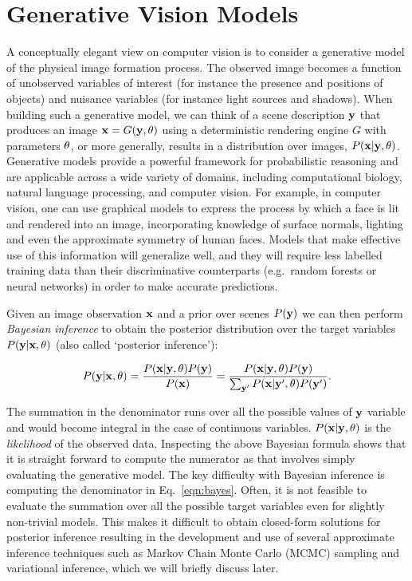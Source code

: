 \section{Generative Vision Models}
\label{sec:gen-models}

A conceptually elegant view on computer vision is to consider a generative
model of the physical image formation process. The observed image becomes a
function of unobserved variables of interest (for instance the presence and positions
of objects) and nuisance variables (for instance light sources and shadows).
%
When building such a generative model, we can think of a scene description
$\mathbf{y}$ that produces an image $\mathbf{x}=G(\mathbf{y},\theta)$ using a deterministic
rendering engine $G$ with parameters $\mathbf{\theta}$, or more generally,
results in a distribution over images, $P(\mathbf{x}|\mathbf{y},\mathbf{\theta})$.
%
Generative models provide a powerful framework for probabilistic reasoning and
are applicable across a wide variety of domains, including computational biology,
natural language processing, and computer vision. For example, in computer vision,
one can use graphical models to express the process by which a face is lit and
rendered into an image, incorporating knowledge of surface normals, lighting and
even the approximate symmetry of human faces. Models that make effective use of this
information will generalize well, and they will require less labelled training data
than their discriminative counterparts (e.g.\ random forests or neural networks) in order
to make accurate predictions.

Given an image observation $\mathbf{x}$ and a prior over scenes $P(\mathbf{y})$ we can
then perform \textit{Bayesian inference} to obtain the posterior distribution over the
target variables $P(\mathbf{y} | \mathbf{x},\mathbf{\theta})$
(also called `posterior inference'):

\begin{equation}
P(\mathbf{y} | \mathbf{x},\mathbf{\theta}) =
\frac{P(\mathbf{x}|\mathbf{y},\mathbf{\theta})P(\mathbf{y})}{P(\mathbf{x})} =
\frac{P(\mathbf{x}|\mathbf{y},\mathbf{\theta})P(\mathbf{y})}{\sum_{\mathbf{y}'} P(\mathbf{x}|\mathbf{y}',\mathbf{\theta})P(\mathbf{y}')}.
\label{eqn:bayes}
\end{equation}

The summation in the denominator runs over all the possible values of $\mathbf{y}$ variable and
would become integral in the case of continuous
variables. $P(\mathbf{x}|\mathbf{y},\mathbf{\theta})$ is the \emph{likelihood} of the observed data. Inspecting
the above Bayesian formula shows that it is straight forward to compute the numerator
as that involves simply evaluating the generative model. The key difficulty with
Bayesian inference is computing the denominator in Eq.~\ref{eqn:bayes}.
Often, it is not feasible to evaluate the summation
over all the possible target variables even for slightly non-trivial models. This
makes it difficult to obtain closed-form solutions for posterior inference resulting
in the development and use of several approximate inference techniques such
as Markov Chain Monte Carlo (MCMC) sampling and variational inference, which we
will briefly discuss later.

